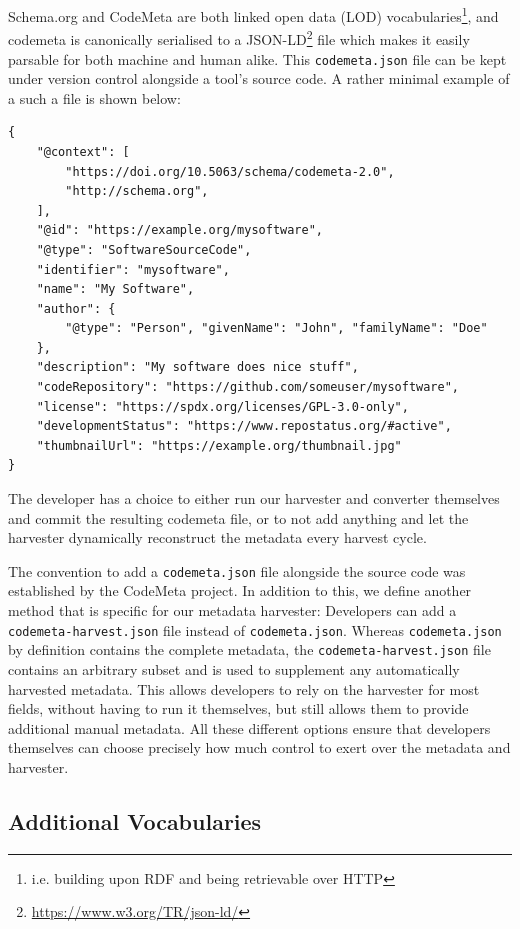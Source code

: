 \documentclass[a4paper,11pt]{article}
\begin{document}
Schema.org and CodeMeta are both linked open data (LOD)
vocabularies\footnote{i.e. building upon RDF and being retrievable over HTTP},
and codemeta is canonically serialised to a
JSON-LD\footnote{\url{https://www.w3.org/TR/json-ld/}} file which makes it
easily parsable for both machine and human alike. This \texttt{codemeta.json}
file can be kept under version control alongside a tool's source code. A 
rather minimal example of a such a file is shown below:

\begin{verbatim}
{
    "@context": [
        "https://doi.org/10.5063/schema/codemeta-2.0",
        "http://schema.org",
    ],
    "@id": "https://example.org/mysoftware",
    "@type": "SoftwareSourceCode",
    "identifier": "mysoftware",
    "name": "My Software",
    "author": {
        "@type": "Person", "givenName": "John", "familyName": "Doe"
    },
    "description": "My software does nice stuff",
    "codeRepository": "https://github.com/someuser/mysoftware",
    "license": "https://spdx.org/licenses/GPL-3.0-only",
    "developmentStatus": "https://www.repostatus.org/#active",
    "thumbnailUrl": "https://example.org/thumbnail.jpg"
}
\end{verbatim}

The developer has a choice to either run our harvester and converter themselves and
commit the resulting codemeta file, or to not add anything and let the harvester
dynamically reconstruct the metadata every harvest cycle.

The convention to add a \texttt{codemeta.json} file alongside the source code
was established by the CodeMeta project. In addition to this, we define another
method that is specific for our metadata harvester: Developers can add a
\texttt{codemeta-harvest.json} file instead of \texttt{codemeta.json}. Whereas
\texttt{codemeta.json} by definition contains the complete metadata, the
\texttt{codemeta-harvest.json} file contains an arbitrary subset and is used to
supplement any automatically harvested metadata. This allows developers to rely
on the harvester for most fields, without having to run it themselves, but
still allows them to provide additional manual metadata. All these different
options ensure that developers themselves can choose precisely how much control
to exert over the metadata and harvester.

\subsection{Additional Vocabularies}
\end{document}
